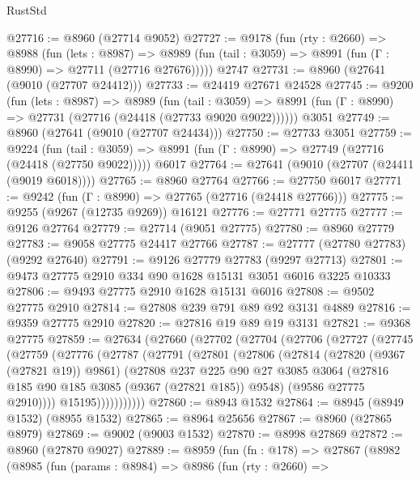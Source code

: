 \begin{lexlean}{RustStd}
\begin{coremodule}
@27716 := @8960 (@27714 @9052)
@27727 := @9178
    (fun (rty : @2660) =>
    @8988
      (fun (lets : @8987) =>
      @8989 (fun (tail : @3059) => @8991 (fun (Γ : @8990) => @27711 (@27716 @27676)))))
    @2747
@27731 := @8960 (@27641 (@9010 (@27707 @24412)))
@27733 := @24419 @27671 @24528
@27745 := @9200
    (fun (lets : @8987) =>
    @8989
      (fun (tail : @3059) =>
      @8991 (fun (Γ : @8990) => @27731 (@27716 (@24418 (@27733 @9020 @9022))))))
    @3051
@27749 := @8960 (@27641 (@9010 (@27707 @24434)))
@27750 := @27733 @3051
@27759 := @9224
    (fun (tail : @3059) => @8991 (fun (Γ : @8990) => @27749 (@27716 (@24418 (@27750 @9022)))))
    @6017
@27764 := @27641 (@9010 (@27707 (@24411 (@9019 @6018))))
@27765 := @8960 @27764
@27766 := @27750 @6017
@27771 := @9242 (fun (Γ : @8990) => @27765 (@27716 (@24418 @27766)))
@27775 := @9255 (@9267 (@12735 @9269)) @16121
@27776 := @27771 @27775
@27777 := @9126 @27764
@27779 := @27714 (@9051 @27775)
@27780 := @8960 @27779
@27783 := @9058 @27775 @24417 @27766
@27787 := @27777 (@27780 @27783) (@9292 @27640)
@27791 := @9126 @27779 @27783 (@9297 @27713)
@27801 := @9473 @27775 @2910 @334 @90 @1628 @15131 @3051 @6016 @3225 @10333
@27806 := @9493 @27775 @2910 @1628 @15131 @6016
@27808 := @9502 @27775 @2910
@27814 := @27808 @239 @791 @89 @92 @3131 @4889
@27816 := @9359 @27775 @2910
@27820 := @27816 @19 @89 @19 @3131
@27821 := @9368 @27775
@27859 := @27634
    (@27660
      (@27702
        (@27704
          (@27706
            (@27727
              (@27745
                (@27759
                  (@27776
                    (@27787
                      (@27791
                        (@27801
                          (@27806
                            (@27814
                              (@27820 (@9367 (@27821 @19)) @9861)
                              (@27808
                                @237
                                @225
                                @90
                                @27
                                @3085
                                @3064
                                (@27816 @185 @90 @185 @3085 (@9367 (@27821 @185)) @9548)
                                (@9586 @27775 @2910))))
                          @15195)))))))))))
@27860 := @8943 @1532
@27864 := @8945 (@8949 @1532) (@8955 @1532)
@27865 := @8964 @25656
@27867 := @8960 (@27865 @8979)
@27869 := @9002 (@9003 @1532)
@27870 := @8998 @27869
@27872 := @8960 (@27870 @9027)
@27889 := @8959
    (fun (fn : @178) =>
    @27867
      (@8982
        (@8985
          (fun (params : @8984) =>
          @8986
            (fun (rty : @2660) =>

\end{coremodule}
\end{lexlean}
